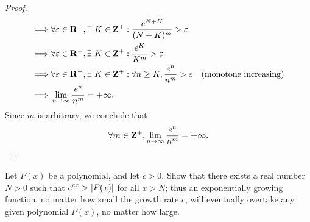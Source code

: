 \begin{proof}
\begin{align*}
    \implies & \forall \varepsilon \in \mathbf{R}^+, \exists\ K \in \mathbf{Z}^+ : \frac{e^{N + K}}{(N + K)^m} > \varepsilon                                                              \\
    \implies & \forall \varepsilon \in \mathbf{R}^+, \exists\ K \in \mathbf{Z}^+ : \frac{e^K}{K^m} > \varepsilon                                                                          \\
    \implies & \forall \varepsilon \in \mathbf{R}^+, \exists\ K \in \mathbf{Z}^+ : \forall n \geq K, \frac{e^n}{n^m} > \varepsilon                         & \text{(monotone increasing)} \\
    \implies & \lim_{n \to \infty} \frac{e^n}{n^m} = +\infty.
  \end{align*}
  Since \(m\) is arbitrary, we conclude that
  \[
    \forall m \in \mathbf{Z}^+, \lim_{n \to \infty} \frac{e^n}{n^m} = +\infty.
  \]
\end{proof}

\begin{exercise}\label{ex 4.5.9}
  Let \(P(x)\) be a polynomial, and let \(c > 0\).
  Show that there exists a real number \(N > 0\) such that \(e^{cx} > \left\lvert P(x)\right\rvert\) for all \(x > N\);
  thus an exponentially growing function, no matter how small the growth rate \(c\), will eventually overtake any given polynomial \(P(x)\), no matter how large.
\end{exercise}

